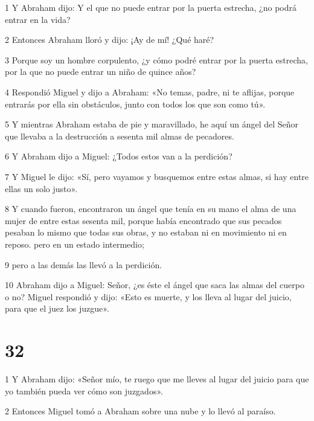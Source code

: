 \par 1 Y Abraham dijo: Y el que no puede entrar por la puerta estrecha, ¿no podrá entrar en la vida?

\par 2 Entonces Abraham lloró y dijo: ¡Ay de mí! ¿Qué haré?

\par 3 Porque soy un hombre corpulento, ¿y cómo podré entrar por la puerta estrecha, por la que no puede entrar un niño de quince años?

\par 4 Respondió Miguel y dijo a Abraham: «No temas, padre, ni te aflijas, porque entrarás por ella sin obstáculos, junto con todos los que son como tú».

\par 5 Y mientras Abraham estaba de pie y maravillado, he aquí un ángel del Señor que llevaba a la destrucción a sesenta mil almas de pecadores.

\par 6 Y Abraham dijo a Miguel: ¿Todos estos van a la perdición?

\par 7 Y Miguel le dijo: «Sí, pero vayamos y busquemos entre estas almas, si hay entre ellas un solo justo».

\par 8 Y cuando fueron, encontraron un ángel que tenía en su mano el alma de una mujer de entre estas sesenta mil, porque había encontrado que sus pecados pesaban lo mismo que todas sus obras, y no estaban ni en movimiento ni en reposo. pero en un estado intermedio;

\par 9 pero a las demás las llevó a la perdición.

\par 10 Abraham dijo a Miguel: Señor, ¿es éste el ángel que saca las almas del cuerpo o no? Miguel respondió y dijo: «Esto es muerte, y los lleva al lugar del juicio, para que el juez los juzgue».

\chapter{32}

\par 1 Y Abraham dijo: «Señor mío, te ruego que me lleves al lugar del juicio para que yo también pueda ver cómo son juzgados».

\par 2 Entonces Miguel tomó a Abraham sobre una nube y lo llevó al paraíso.

